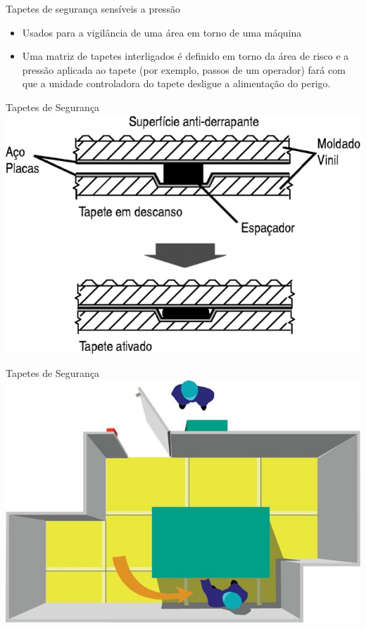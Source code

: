 \documentclass[aspectratio=169,
				xcolor=table]{beamer}
\begin{document}
		\begin{frame}{Tapetes de segurança sensíveis a pressão}
			\begin{itemize}
				\item Usados para a vigilância de uma área em torno de uma máquina
				\vspace{0.8cm}
				\item Uma matriz de tapetes interligados é definido em torno da área de risco e a pressão aplicada ao tapete (por exemplo, passos de um operador) fará com que a unidade controladora do tapete desligue a alimentação do perigo. 
			\end{itemize}
		\end{frame}
		
		\begin{frame}{Tapetes de Segurança}
			\centering
			\includegraphics[scale=.5]{../figs/cap03/Imagem32}		
		\end{frame}
		
		\begin{frame}{Tapetes de Segurança}
			\centering
			\includegraphics[scale=.5]{../figs/cap03/Imagem33}		
		\end{frame}	
		
\end{document}
